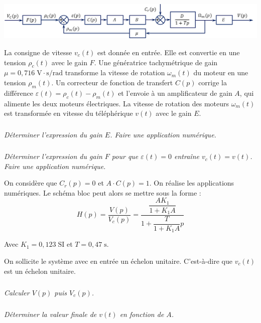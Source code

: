 \documentclass[10pt]{article}
\newif\ifprof
\begin{document}
\begin{center}
\includegraphics[width=\textwidth]{images/SchemaBloc_03}
\end{center}


La consigne de vitesse $v_c(t)$ est donnée en entrée. Elle est convertie en une tension $\rho_c(t)$ avec le gain $F$. Une génératrice tachymétrique de gain $\mu =0,716 \; \text{V}\cdot \text{s/rad}$ transforme la vitesse de rotation $\omega_m(t)$ du moteur en une tension $\rho_m(t)$. Un correcteur de fonction de transfert $C(p)$ corrige la différence $\varepsilon (t)= \rho_c(t) -  \rho_m(t)$ et l’envoie à un amplificateur de gain $A$, qui alimente les deux moteurs électriques. La vitesse de rotation des moteurs $\omega_m(t)$ est transformée en vitesse du téléphérique $v(t)$ avec le gain $E$.

\subparagraph{}
\textit{Déterminer l’expression du gain $E$. Faire une application numérique.}
\ifprof
\begin{corrige}
\end{corrige}
\else
\fi



\subparagraph{}
\textit{Déterminer l’expression du gain $F$ pour que $\varepsilon (t)=0$ entraîne $v_c(t)=v(t)$. Faire une application numérique.}
\ifprof
\begin{corrige}
\end{corrige}
\else
\fi


On considère que $C_r (p)=0$ et $A\cdot C(p)=1$. On réalise les applications numériques. Le schéma bloc peut alors se mettre sous la forme : 
$$
H(p)=\dfrac{V(p)}{V_c (p)}= \dfrac{\dfrac{AK_1}{1+K_1A}}{1+\dfrac{T}{1+K_1A} p}
$$

Avec 
$K_1=0,123 \;\text{SI}$ et $T=0,47\;\text{s}$.

On sollicite le système avec en entrée un échelon unitaire. C’est-à-dire que $v_c(t)$ est un échelon unitaire. 


\subparagraph{}
\textit{Calculer $V(p)$ puis $V_c (p)$. }
\ifprof
\begin{corrige}
\end{corrige}
\else
\fi



\subparagraph{}
\textit{Déterminer la valeur finale de $v(t)$ en fonction de $A$. }
\ifprof
\begin{corrige}
\end{corrige}
\else
\fi
\end{document}
